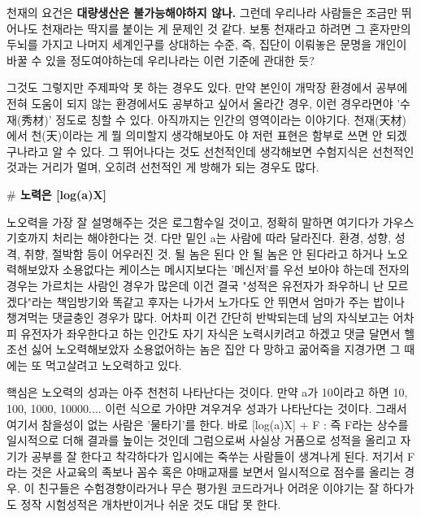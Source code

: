 천재의 요건은 \textbf{대량생산은 불가능해야하지 않나.}
그런데 우리나라 사람들은 조금만 뛰어나도 천재라는 딱지를 붙이는 게 문제인 것 같다.
보통 천재라고 하려면 그 혼자만의 두뇌를 가지고 나머지 세계인구를 상대하는 수준,
즉, 집단이 이뤄놓은 문명을 개인이 바꿀 수 있을 정도여야하는데 우리나라는 이런 기준에 관대한 듯?
\vspace{5mm}

그것도 그렇지만 주제파악 못 하는 경우도 있다.
만약 본인이 개막장 환경에서 공부에 전혀 도움이 되지 않는 환경에서도 공부하고 싶어서 올라간 경우,
이런 경우라면야 '수재(秀材)' 정도로 칭할 수 있다. 아직까지는 인간의 영역이라는 이야기다.
천재(天材)에서 천(天)이라는 게 뭘 의미할지 생각해보아도 야 저런 표현은 함부로 쓰면 안 되겠구나라고 알 수 있다.
그 뛰어나다는 것도 선천적인데 생각해보면 수험지식은 선천적인 것과는 거리가 멀며, 오히려 선천적인 게 방해가 되는 경우도 많다.
\vspace{5mm}

\textbf{$\#$ 노력은 [log(a)X]}
\vspace{5mm}

노오력을 가장 잘 설명해주는 것은 로그함수일 것이고, 정확히 말하면 여기다가 가우스 기호까지 처리는 해야한다는 것.
다만 밑인 a는 사람에 따라 달라진다. 환경, 성향, 성격, 취향, 절박함 등이 어우러진 것.
될 놈은 된다 안 될 놈은 안 된다라고 하거나
노오력해보았자 소용없다는 케이스는 메시지보다는 '메신저'를 우선 보아야 하는데
전자의 경우는 가르치는 사람인 경우가 많은데 이건 결국 "성적은 유전자가 좌우하니 난 모르겠다"라는 책임방기와 똑같고
후자는 나가서 노가다도 안 뛰면서 엄마가 주는 밥이나 챙겨먹는 댓글충인 경우가 많다.
어차피 이건 간단히 반박되는데 남의 자식보고는 어차피 유전자가 좌우한다고 하는 인간도 자기 자식은 노력시키려고 하겠고
댓글 달면서 헬조선 싫어 노오력해보았자 소용없어하는 놈은 집안 다 망하고 굶어죽을 지경가면 그 때에는 또 먹고살려고 노오력하고 있다.
\vspace{5mm}

핵심은 노오력의 성과는 아주 천천히 나타난다는 것이다.
만약 a가 10이라고 하면 10, 100, 1000, 10000.... 이런 식으로 가야먄 겨우겨우 성과가 나타난다는 것이다.
그래서 여기서 참을성이 없는 사람은 '물타기'를 한다. 바로 [log(a)X] + F : 즉 F라는 상수를 일시적으로 더해 결과를 높이는 것인데
그럼으로써 사실상 거품으로 성적을 올리고 자기가 공부를 잘 한다고 착각하다가 입시에는 죽쑤는 사람들이 생겨나게 된다.
저기서 F라는 것은 사교육의 족보나 꼼수 혹은 야매교재를 보면서 일시적으로 점수를 올리는 경우.
이 친구들은 수험경향이라거나 무슨 평가원 코드라거나 어려운 이야기는 잘 하다가도 정작 시험성적은 개차반이거나 쉬운 것도 대답 못 한다.
\vspace{5mm}

